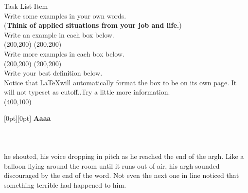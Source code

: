 \documentclass[12pt]{exam}
\begin{document}
Task List Item 
    \\
    Write some examples in your own words.
    \\ (\textbf{Think of applied situations from your job and life.})\\
    Write an example in each box below.\\
\framebox(200,200){} 
\framebox(200,200){} \\
    Write more examples in each box below.\\
\framebox(200,200){} 
\framebox(200,200){} \\
	Write your best definition below.\\
	Notice that \LaTeX will automatically format the box to be on its own page. It will not typeset as cutoff..Try a little more information.\\
\framebox(400,100){} \\
\par


\begin{center}
\par

\noindent{}
\end{center}

\raisebox{0pt}[0pt][0pt]{\Large%
  \textbf{Aaaa\raisebox{-0.3ex}{a}%
    \raisebox{-0.7ex}{aa}%
    \raisebox{-1.2ex}{r}%
    \raisebox{-2.2ex}{g}%
    \raisebox{-4.5ex}{h}
  }
}
\\ \\ \\ \\ he shouted, his voice dropping in pitch as he reached the end of the argh. Like a balloon flying around the room until it runs out of air, his argh sounded discouraged by the end of the word. Not even the next
one in line noticed that something
terrible had happened to him.
\end{document}

